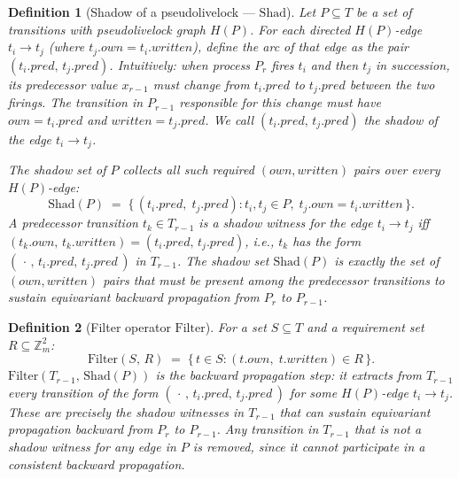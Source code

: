 \documentclass{article}
\newtheorem{definition}{Definition}
\newcommand{\Shad}{\mathrm{Shad}}
\newcommand{\Filter}{\mathrm{Filter}}
\newcommand{\Zm}{\mathbb{Z}_m}
\newcommand{\own}{\mathit{own}}
\newcommand{\writ}{\mathit{written}}
\newcommand{\pred}{\mathit{pred}}
\begin{document}
\begin{definition}[Shadow of a pseudolivelock --- $\Shad$]
\label{def:shad}
Let $P\subseteq T$ be a set of transitions with pseudolivelock graph
$H(P)$.  For each directed $H(P)$-edge $t_i\!\to\!t_j$ (where
$t_j.\own = t_i.\writ$), define the \emph{arc} of that edge as the
pair $(t_i.\pred,\, t_j.\pred)$.  Intuitively: when process $P_r$
fires $t_i$ and then $t_j$ in succession, its predecessor value
$x_{r-1}$ must change from $t_i.\pred$ to $t_j.\pred$ between the
two firings.  The transition in $P_{r-1}$ responsible for this change
must have $\own = t_i.\pred$ and $\writ = t_j.\pred$.  We call
$(t_i.\pred,\, t_j.\pred)$ the \emph{shadow} of the edge
$t_i\!\to\!t_j$.

The \emph{shadow set} of $P$ collects all such required $(\own,\writ)$
pairs over every $H(P)$-edge:
\[
  \Shad(P) \;=\;
  \bigl\{\,(t_i.\pred,\; t_j.\pred) :
     t_i,t_j\in P,\; t_j.\own = t_i.\writ\,\bigr\}.
\]
A predecessor transition $t_k\in T_{r-1}$ is a \emph{shadow witness}
for the edge $t_i\!\to\!t_j$ iff $(t_k.\own,\,t_k.\writ)=(t_i.\pred,\,t_j.\pred)$,
i.e., $t_k$ has the form $(\,\cdot\,,\, t_i.\pred,\, t_j.\pred\,)$
in $T_{r-1}$.  The shadow set $\Shad(P)$ is exactly the set of
$(\own,\writ)$ pairs that must be present among the predecessor
transitions to sustain equivariant backward propagation from $P_r$ to
$P_{r-1}$.
\end{definition}

\begin{definition}[Filter operator $\Filter$]
\label{def:filter}
For a set $S\subseteq T$ and a requirement set $R\subseteq\Zm^2$:
\[
  \Filter(S,\,R) \;=\; \{\,t\in S : (t.\own,\; t.\writ)\in R\,\}.
\]
$\Filter(T_{r-1},\,\Shad(P))$ is the \emph{backward propagation step}:
it extracts from $T_{r-1}$ every transition of the form
$(\,\cdot\,,\, t_i.\pred,\, t_j.\pred\,)$ for some $H(P)$-edge
$t_i\!\to\!t_j$.  These are precisely the shadow witnesses in $T_{r-1}$
that can sustain equivariant propagation backward from $P_r$ to
$P_{r-1}$.  Any transition in $T_{r-1}$ that is not a shadow witness
for any edge in $P$ is removed, since it cannot participate in a
consistent backward propagation.
\end{definition}
\end{document}
